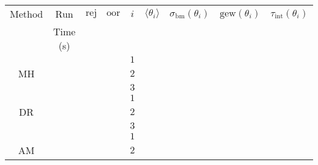 \begin{table}[h!]
\begin{center}
\begin{tabular}{|c|c|c|c|c|c|c|c|c|}
\hline
Method & Run      & $\text{rej}$           & $\text{oor}$           & $i$ & $\langle\theta_i\rangle$ & $\sigma_{\text{bm}}(\theta_i)$ & $\text{gew}(\theta_i)$ & $\tau_{\text{int}}(\theta_i)$ \\
       & Time (s) &                        &                        &     &                          &                                &                        &                               \\
\hline
\hline
       &          &                        &                        & $1$ &                          &                                &                        &                               \\
\cline{5-9}
MH     &          &                        &                        & $2$ &                          &                                &                        &                               \\
\cline{5-9}
       &          &                        &                        & $3$ &                          &                                &                        &                               \\
\hline
\hline
       &          &                        &                        & $1$ &                          &                                &                        &                               \\
\cline{5-9}
DR     &          &                        &                        & $2$ &                          &                                &                        &                               \\
\cline{5-9}
       &          &                        &                        & $3$ &                          &                                &                        &                               \\
\hline
\hline
       &          &                        &                        & $1$ &                          &                                &                        &                               \\
\cline{5-9}
AM     &          &                        &                        & $2$ &                          &                                &                        &                               \\

\end{tabular}
\end{center}
\end{table}
